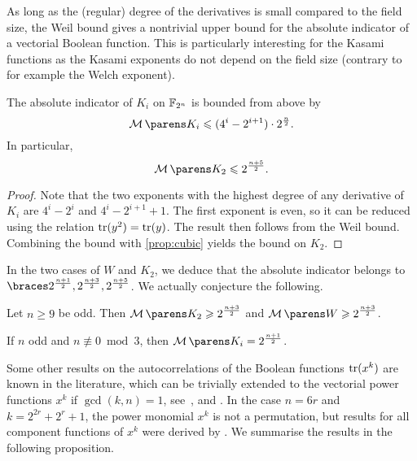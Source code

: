 As long as the (regular) degree of the derivatives is small compared to the field size, the Weil bound gives a nontrivial upper bound for the absolute indicator of a vectorial Boolean function.
This is particularly interesting for the Kasami functions as the Kasami exponents do not depend on the field size (contrary to for example the Welch exponent).
\begin{proposition}
    The absolute indicator of $K_i$ on $\mathbb{F}_{2^n}$ is bounded from above by
    \begin{equation*}
        \absoluteindicator{K_i} \leqslant (4^i-2^{i+1}) \cdot 2^{\frac{n}{2}}.
    \end{equation*}
    In particular,
    \begin{equation*}
        \absoluteindicator{K_2} \leqslant 2^{\frac{n+5}{2}}.
    \end{equation*}
\end{proposition}
\begin{proof}
    Note that the two exponents with the highest degree of any derivative of $K_i$ are $4^i-2^i$ and $4^i-2^{i+1}+1$.
    The first exponent is even, so it can be reduced using the relation $\operatorname{tr}(y^2)=\operatorname{tr}(y)$.
    The result then follows from the Weil bound.
    Combining the bound with \cref{prop:cubic} yields the bound on $K_2$.
\end{proof}
In the two cases of $W$ and $K_2$, we deduce that the absolute indicator belongs to $\set{2^{\frac{n+1}{2}}, 2^{\frac{n+3}{2}}, 2^{\frac{n+5}{2}}}$.
We actually conjecture the following.
\begin{conjecture}\label{con:kasami_welch}
    Let $n \geqslant 9$ be odd.
    Then $\displaystyle\absoluteindicator{K_2} \geqslant 2^{\frac{n+3}{2}}$ and $\displaystyle\absoluteindicator{W} \geqslant 2^{\frac{n+3}{2}}$.
\end{conjecture}

\begin{conjecture}\label{con:kasami}
    If $n$ odd and $n \not \equiv 0 \bmod{3}$, then $\absoluteindicator{K_i} = 2^{\frac{n+1}{2}}$.
\end{conjecture}

Some other results on the autocorrelations of the Boolean functions $\operatorname{tr}(x^k)$ are known in the literature, which can be trivially extended to the vectorial power functions $x^k$ if $\gcd(k,n)=1$, see~\cite[Theorem~5]{SAC:GonKho03}, \cite{TIT:Carlet08} and \cite[Lemmata 2 and 3]{IS:SunWu09}.
In the case $n = 6r$ and $k=2^{2r}+2^r+1$, the power monomial $x^k$ is not a permutation, but results for all component functions of $x^k$ were derived by \textcite{FFA:CanChaKyu08}.
We summarise the results in the following proposition.

